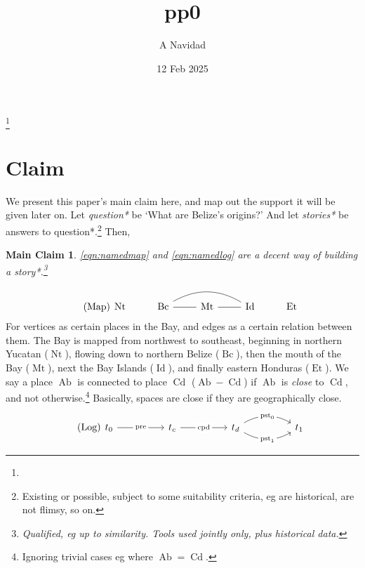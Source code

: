 \documentclass{amsart}
\newcommand{\mention}[1]{\textit{#1}} %
\DeclareMathOperator{\ab}{Ab} %
\DeclareMathOperator{\cd}{Cd} %
\DeclareMathOperator{\id}{Id} %
\DeclareMathOperator{\mt}{Mt} %
\DeclareMathOperator{\bc}{Bc} %
\DeclareMathOperator{\et}{Et} %
\DeclareMathOperator{\nt}{Nt} %
\DeclareMathOperator{\pre}{pre} %
\DeclareMathOperator{\pst}{pst} %
\DeclareMathOperator{\cpd}{cpd} %
\newtheorem{mainclm}{Main Claim} %
\theoremstyle{definition}
\theoremstyle{remark}
\begin{document}
%
%
\title{pp0}
\author{A Navidad}
\address{Harvard College, Cambridge MA}
\date{12 Feb 2025}
\thanks{} %
\begin{abstract}
\end{abstract}
\keywords{}
\maketitle
%
%
%
\section{Claim}
\label{s:claim}
	We present this paper's main claim here, and map out the support it will be given later on. Let \mention{question*} be `What are Belize's origins?' And let \mention{stories*} be answers to question*.\footnote{Existing or possible, subject to some suitability criteria, eg are historical, are not flimsy, so on.} Then,
	\begin{mainclm}
	\label{clm:maindecency}
	\ref{eqn:namedmap} and \ref{eqn:namedlog} are a decent way of building a story*.\footnote{Qualified, eg up to similarity. Tools used jointly only, plus historical data.}
	\end{mainclm}
	\begin{equation}
	\tag{Map}
	\label{eqn:namedmap}
		\begin{tikzcd}[arrows=dash]
		\nt &\bc \rar \ar[rr,bend left] &\mt \rar &\id &\et
		\end{tikzcd}
	\end{equation}
	For vertices as certain places in the Bay, and edges as a certain relation between them. The Bay is mapped from northwest to southeast, beginning in northern Yucatan (\(\nt\)), flowing down to northern Belize (\(\bc\)), then the mouth of the Bay (\(\mt\)), next the Bay Islands (\(\id\)), and finally eastern Honduras (\(\et\)). We say a place \(\ab\) is connected to place \(\cd\) (\(\ab-\cd\)) if \(\ab\) is \mention{close} to \(\cd\), and not otherwise.\footnote{Ignoring trivial cases eg where \(\ab=\cd\).} Basically, spaces are close if they are geographically close.
	\begin{equation}
	\tag{Log}
	\label{eqn:namedlog}
		\begin{tikzcd}[sep=huge]
		t_0 \rar["\pre" description] &t_c \rar["\cpd" description] &t_d \rar[bend left,"\pst_0" description] \rar[bend right,"\pst_1" description] &t_1
		\end{tikzcd}
	\end{equation}
\end{document}
